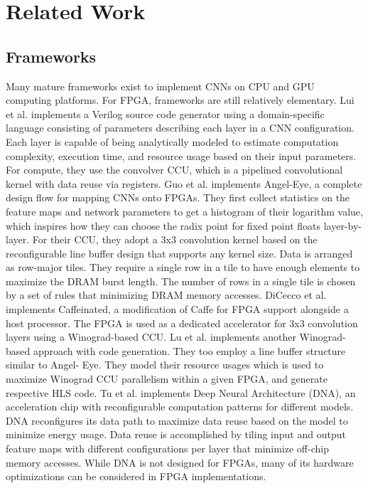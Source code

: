 \chapter{Related Work}

\section{Frameworks}
Many mature frameworks exist to implement CNNs on CPU and GPU computing platforms. For FPGA, frameworks are still relatively elementary. Lui et al. \cite{liu2016automatic} implements a Verilog source code generator using a domain-specific language consisting of parameters describing each layer in a CNN configuration. Each layer is capable of being analytically modeled to estimate computation complexity, execution time, and resource usage based on their input parameters. For compute, they use the convolver CCU, which is a pipelined convolutional kernel with data reuse via registers. Guo et al. \cite{guo2018angel} implements Angel-Eye, a complete design flow for mapping CNNs onto FPGAs. They first collect statistics on the feature maps and network parameters to get a histogram of their logarithm value, which inspires how they can choose the radix point for fixed point floats layer-by-layer. For their CCU, they adopt a 3x3 convolution kernel based on the reconfigurable line buffer design \cite{zhang2016caffeine} that supports any kernel size. Data is arranged as row-major tiles. They require a single row in a tile to have enough elements to maximize the DRAM burst length. The number of rows in a single tile is chosen by a set of rules that minimizing DRAM memory accesses. DiCecco et al. \cite{dicecco2016caffeinated} implements Caffeinated, a modification of Caffe for FPGA support alongside a host processor. The FPGA is used as a dedicated accelerator for 3x3 convolution layers using a Winograd-based CCU. Lu et al. \cite{lu2017evaluating} implements another Winograd- based approach with code generation. They too employ a line buffer structure similar to Angel- Eye. They model their resource usages which is used to maximize Winograd CCU parallelism within a given FPGA, and generate respective HLS code. Tu et al. \cite{tu2017deep} implements Deep Neural Architecture (DNA), an acceleration chip with reconfigurable computation patterns for different models. DNA reconfigures its data path to maximize data reuse based on the model to minimize energy usage. Data reuse is accomplished by tiling input and output feature maps with different configurations per layer that minimize off-chip memory accesses. While DNA is not designed for FPGAs, many of its hardware optimizations can be considered in FPGA implementations.

